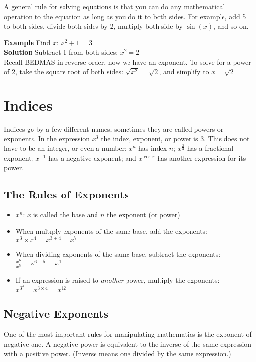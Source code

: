 \begin{tcolorbox}
A general rule for solving equations is that you can do any mathematical operation to the equation as long as you do it to both sides. For example, add 5 to both sides, divide both sides by 2, multiply both side by $\sin(x)$, and so on.
\end{tcolorbox}

\textbf{Example} Find $x$: $x^2+1=3$\\
\textbf{Solution} Subtract 1 from both sides: $x^2=2$\\
Recall BEDMAS in reverse order, now we have an exponent. To solve for a power of 2, take the square root of both sides: $\sqrt{x^2}=\sqrt{2}$, and simplify to $x=\sqrt{2}$

\section*{Indices}
Indices go by a few different names, sometimes they are called powers or exponents. In the expression $x^3$ the index, exponent, or power is $3$. This does not have to be an integer, or even a number: $x^n$ has index $n$; $x^{\frac{2}{3}}$ has a fractional exponent; $x^{-1}$ has a negative exponent; and $x^{\cos x}$ has another expression for its power.

\subsection*{The Rules of Exponents}
\begin{tcolorbox}
	\begin{itemize}
		\item $x^n$: $x$ is called the base and $n$ the exponent (or power)
		\item When multiply exponents of the same base, add the exponents: $x^3\times x^4=x^{3+4}=x^7$
		\item When dividing exponents of the same base, subtract the exponents:
		$\frac{x^6}{x^5}=x^{6-5}=x^1$
		\item If an expression is raised to \textit{another} power, multiply the exponents:
		$x^{3^4}=x^{3\times 4}=x^{12}$
	\end{itemize}
\end{tcolorbox}	

\subsection*{Negative Exponents}
One of the most important rules for manipulating mathematics is the exponent of negative one. A negative power is equivalent to the inverse of the same expression with a positive power. (Inverse means one divided by the same expression.)\\

